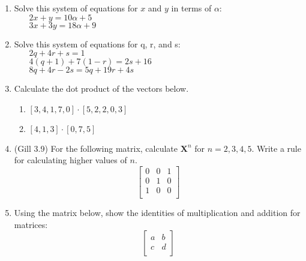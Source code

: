 \documentclass[11pt]{article}
\begin{document}
\begin{enumerate}
\item Solve this system of equations for $x$ and $y$ in terms of $\alpha$: \\
$~~~~~~~~2x + y = 10\alpha + 5$ \\
$~~~~~~~~3x + 3y = 18\alpha + 9$ %


\item Solve this system of equations for q, r, and s: \\
$~~~~~~~~2q + 4r + s = 1$ \\
$~~~~~~~~4(q+1) + 7(1-r) = 2s + 16$ \\
$~~~~~~~~8q + 4r - 2s = 5q + 19r + 4s$ %


\item Calculate the dot product of the vectors below.
\begin{enumerate}
\item $[3, 4, 1, 7, 0] \cdot [5, 2, 2, 0, 3]$ %
\item $[4, 1, 3] \cdot [0, 7, 5]$ %
\end{enumerate}



\item (Gill 3.9) For the following matrix, calculate $\textbf{X}^n$ for $n = 2, 3, 4, 5$.  Write a rule for calculating higher values of $n$.
\[
\left[\begin{array}{ccc}
0 & 0 & 1 \\
0 & 1 & 0 \\
1 & 0 & 0 \\
\end{array}\right]
\]


\item Using the matrix below, show the identities of multiplication and addition for matrices:
\[
\left[\begin{array}{cc}
a & b \\
c & d \\
\end{array}\right]
\]




\end{enumerate}
\end{document}
